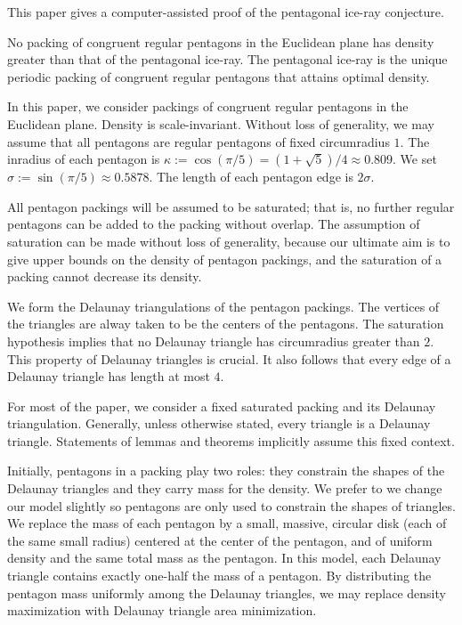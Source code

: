 
This paper gives a computer-assisted proof of the pentagonal ice-ray conjecture.


\begin{theorem}  No packing of congruent regular pentagons in the Euclidean
plane has density greater than that of
the pentagonal ice-ray.   The pentagonal ice-ray is the
unique periodic packing of congruent regular pentagons that attains optimal density.
\end{theorem}



In this paper, we consider packings of congruent regular pentagons in
the Euclidean plane.   Density is scale-invariant.  Without loss of generality,
we may assume that all pentagons are regular pentagons of fixed
circumradius $1$.  The inradius of each pentagon is $\kappa:= \cos
(\pi/5) = (1+\sqrt{5})/4 \approx 0.809$. We set $\sigma := \sin(\pi/5)
\approx 0.5878$.  The length of each pentagon edge is $2\sigma$.

All pentagon packings will be assumed to be saturated; that is, no
further regular pentagons can be added to the packing without overlap.
The assumption of saturation can be made without loss of generality,
because our ultimate aim is to give upper bounds on the density of
pentagon packings, and the saturation of a packing cannot decrease its
density.

We form the Delaunay triangulations of the pentagon packings.  The
vertices of the triangles are alway taken to be the centers of the
pentagons.  The saturation hypothesis implies that no Delaunay
triangle has circumradius greater than $2$.  This property of Delaunay
triangles is crucial.  It also follows that every edge of a Delaunay
triangle has length at most $4$.

For most of the paper, we consider a fixed saturated packing and its
Delaunay triangulation.  Generally, unless otherwise stated,
every triangle is a  Delaunay triangle.
Statements of lemmas and theorems implicitly
assume this fixed context.

Initially, pentagons in a packing play two roles: they constrain the
shapes of the Delaunay triangles and they carry mass for the density.
We prefer to we change our model slightly so pentagons are only used
to constrain the shapes of triangles.  We replace the mass of each
pentagon by a small, massive, circular disk (each of the same small
radius) centered at the center of the pentagon, and of uniform density
and the same total mass as the pentagon.  In this model, each Delaunay
triangle contains exactly one-half the mass of a pentagon.  By
distributing the pentagon mass uniformly among the Delaunay triangles,
we may replace density maximization with Delaunay triangle area
minimization.

